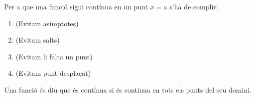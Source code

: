 \begin{theorybox}
	Per a que una funció sigui contínua en un punt $x=a$ s'ha de complir:
	\begin{enumerate}
		\item {} (Evitam asímptotes)
		\item {}  (Evitam salts)
		\item \makebox[7.5cm][l]{Existeix $f(a)$]} (Evitam li falta un punt)
		\item {} (Evitam punt desplaçat)
	\end{enumerate}
	Una funció és diu que és contínua si és contínua en tots els punts del seu domini. 
\end{theorybox}

\pagebreak

